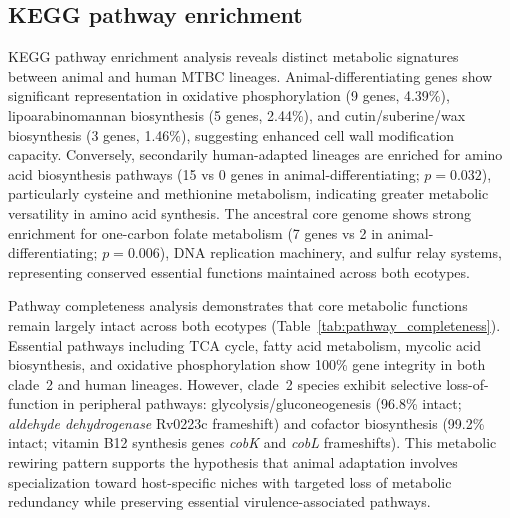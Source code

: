 \documentclass[11pt,a4paper]{article}
\begin{document}
\subsection{KEGG pathway enrichment}
\label{sec:results:kegg}

KEGG pathway enrichment analysis reveals distinct metabolic signatures between animal and human MTBC lineages. Animal-differentiating genes show significant representation in oxidative phosphorylation (9 genes, 4.39\%), lipoarabinomannan biosynthesis (5 genes, 2.44\%), and cutin/suberine/wax biosynthesis (3 genes, 1.46\%), suggesting enhanced cell wall modification capacity. Conversely, secondarily human-adapted lineages are enriched for amino acid biosynthesis pathways (15 vs 0 genes in animal-differentiating; $p = 0.032$), particularly cysteine and methionine metabolism, indicating greater metabolic versatility in amino acid synthesis. The ancestral core genome shows strong enrichment for one-carbon folate metabolism (7 genes vs 2 in animal-differentiating; $p = 0.006$), DNA replication machinery, and sulfur relay systems, representing conserved essential functions maintained across both ecotypes.

Pathway completeness analysis demonstrates that core metabolic functions remain largely intact across both ecotypes (Table~\ref{tab:pathway_completeness}). Essential pathways including TCA cycle, fatty acid metabolism, mycolic acid biosynthesis, and oxidative phosphorylation show 100\% gene integrity in both clade~2 and human lineages. However, clade~2 species exhibit selective loss-of-function in peripheral pathways: glycolysis/gluconeogenesis (96.8\% intact; \textit{aldehyde dehydrogenase} Rv0223c frameshift) and cofactor biosynthesis (99.2\% intact; vitamin B12 synthesis genes \textit{cobK} and \textit{cobL} frameshifts). This metabolic rewiring pattern supports the hypothesis that animal adaptation involves specialization toward host-specific niches with targeted loss of metabolic redundancy while preserving essential virulence-associated pathways.
\end{document}
